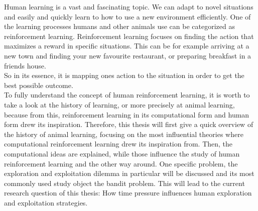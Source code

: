 Human learning is a vast and fascinating topic. We can adapt to novel situations and easily and quickly learn to how to use a new environment efficiently. 
One of the learning processes humans and other animals use can be categorized as reinforcement learning. %
Reinforcement learning focuses on finding the action that maximizes a reward in specific situations. %
This can be for example arriving at a new town and finding your new favourite restaurant, or preparing breakfast in a friends house. \\
So in its essence, it is mapping ones action to the situation in order to get the best possible outcome.\\ %
To fully understand the concept of human reinforcement learning, it is worth to take a look at the history of learning, or more precisely at animal learning, because from this, reinforcement learning in its computational form and human form drew its inspiration. %
Therefore, this thesis will first give a quick overview of the history of animal learning, focusing on the most influential theories where computational reinforcement learning drew its inspiration from. Then, the computational ideas are explained, while those influence the study of human reinforcement learning and the other way around. One specific problem, the exploration and exploitation dilemma in particular will be discussed and its most commonly used study object the bandit problem. This will lead to the current research question of this thesis: How time pressure influences human exploration and exploitation strategies. \\ %


